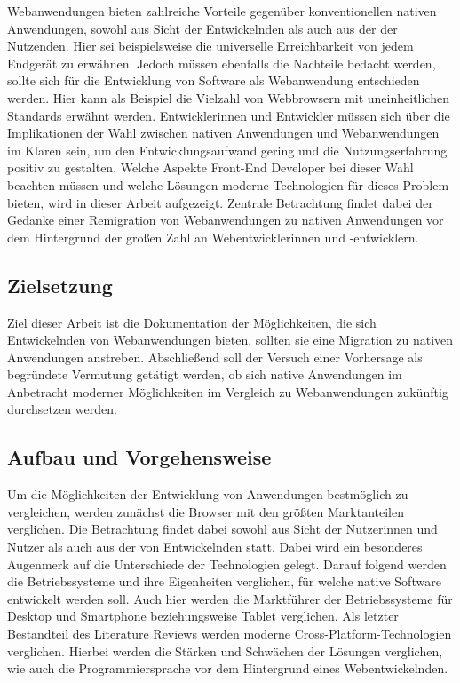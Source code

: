 \documentclass[a4paper]{scrartcl}
\begin{document}
Webanwendungen bieten zahlreiche Vorteile gegenüber konventionellen nativen Anwendungen, sowohl aus Sicht der Entwickelnden als auch aus der der Nutzenden. Hier sei beispielsweise die universelle Erreichbarkeit von jedem Endgerät zu erwähnen. Jedoch müssen ebenfalls die Nachteile bedacht werden, sollte sich für die Entwicklung von Software als Webanwendung entschieden werden. Hier kann als Beispiel die Vielzahl von Webbrowsern mit uneinheitlichen Standards erwähnt werden. Entwicklerinnen und Entwickler müssen sich über die Implikationen der Wahl zwischen nativen Anwendungen und Webanwendungen im Klaren sein, um den Entwicklungsaufwand gering und die Nutzungserfahrung positiv zu gestalten. Welche Aspekte Front-End Developer bei dieser Wahl beachten müssen und welche Lösungen moderne Technologien für dieses Problem bieten, wird in dieser Arbeit aufgezeigt. Zentrale Betrachtung findet dabei der Gedanke einer Remigration von Webanwendungen zu nativen Anwendungen vor dem Hintergrund der großen Zahl an Webentwicklerinnen und -entwicklern.

\newpage

\subsection{Zielsetzung}
Ziel dieser Arbeit ist die Dokumentation der Möglichkeiten, die sich Entwickelnden von Webanwendungen bieten, sollten sie eine Migration zu nativen Anwendungen anstreben. Abschließend soll der Versuch einer Vorhersage als begründete Vermutung getätigt werden, ob sich native Anwendungen im Anbetracht moderner Möglichkeiten im Vergleich zu Webanwendungen zukünftig durchsetzen werden. 

\newpage

\subsection{Aufbau und Vorgehensweise}
Um die Möglichkeiten der Entwicklung von Anwendungen bestmöglich zu vergleichen, werden zunächst die Browser mit den größten Marktanteilen verglichen. Die Betrachtung findet dabei sowohl aus Sicht der Nutzerinnen und Nutzer als auch aus der von Entwickelnden statt. Dabei wird ein besonderes Augenmerk auf die Unterschiede der Technologien gelegt. Darauf folgend werden die Betriebssysteme und ihre Eigenheiten verglichen, für welche native Software entwickelt werden soll. Auch hier werden die Marktführer der Betriebssysteme für Desktop und Smartphone beziehungsweise Tablet verglichen. Als letzter Bestandteil des Literature Reviews werden moderne Cross-Platform-Technologien verglichen. Hierbei werden die Stärken und Schwächen der Lösungen verglichen, wie auch die Programmiersprache vor dem Hintergrund eines Webentwickelnden. \\
\end{document}

